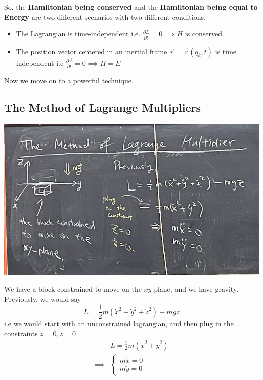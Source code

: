 \documentclass[11pt]{article}
\begin{document}
\vskip 0.25cm
So, the \textbf{Hamiltonian being conserved} and the \textbf{Hamiltonian being equal to Energy} are two different scenarios with two different conditions.

\begin{redbox}
  \begin{itemize}
    \item The Lagrangian is time-independent i.e. $\frac{\partial L}{\partial t} = 0 \implies H$ is conserved. 
    \item The position vector centered in an inertial frame $\vec{r} = \vec{r}(q_k, t)$ is time independent i.e $\frac{\partial \vec{r}}{\partial t} = 0 \implies H = E$
  \end{itemize}
\end{redbox}

\vskip 0.5cm
Now we move on to a powerful technique.

\vskip 1cm
\subsection{The Method of Lagrange Multipliers}

\vskip 0.5cm
\begin{center}
  \includegraphics[scale=0.3]{July 3/july 3 pic 2 method of lagrange multipliers.png}
\end{center}

\vskip 0.5cm
We have a block constrained to move on the $xy$-plane, and we have gravity. Previously, we would say 
\[ L = \frac{1}{2} m \left( \dot{x}^2 + \dot{y}^2 + \dot{z}^2\right) - mgz \] i.e we would start with an unconstrained lagrangian, and then plug in the constraints $z = 0, \dot{z} = 0$
\begin{align*}
  &L = \frac{1}{2}m(\dot{x}^2 + \dot{y}^2) \\
  \implies & \begin{cases}
    m \ddot{x} = 0 \\
    m \ddot{y} = 0
  \end{cases} 
\end{align*}
\end{document}
